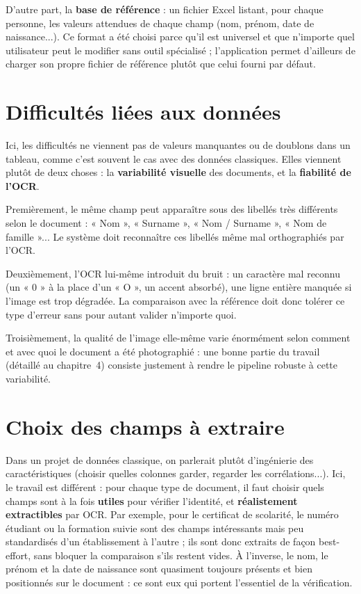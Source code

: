 D'autre part, la \textbf{base de référence} : un fichier Excel listant, pour chaque personne, les valeurs attendues de chaque champ (nom, prénom, date de naissance...). Ce format a été choisi parce qu'il est universel et que n'importe quel utilisateur peut le modifier sans outil spécialisé ; l'application permet d'ailleurs de charger son propre fichier de référence plutôt que celui fourni par défaut.

\section{Difficultés liées aux données}

Ici, les difficultés ne viennent pas de valeurs manquantes ou de doublons dans un tableau, comme c'est souvent le cas avec des données classiques. Elles viennent plutôt de deux choses : la \textbf{variabilité visuelle} des documents, et la \textbf{fiabilité de l'OCR}.

Premièrement, le même champ peut apparaître sous des libellés très différents selon le document : « Nom », « Surname », « Nom / Surname », « Nom de famille »... Le système doit reconnaître ces libellés même mal orthographiés par l'OCR.

Deuxièmement, l'OCR lui-même introduit du bruit : un caractère mal reconnu (un « 0 » à la place d'un « O », un accent absorbé), une ligne entière manquée si l'image est trop dégradée. La comparaison avec la référence doit donc tolérer ce type d'erreur sans pour autant valider n'importe quoi.

Troisièmement, la qualité de l'image elle-même varie énormément selon comment et avec quoi le document a été photographié : une bonne partie du travail (détaillé au chapitre~4) consiste justement à rendre le pipeline robuste à cette variabilité.

\section{Choix des champs à extraire}

Dans un projet de données classique, on parlerait plutôt d'ingénierie des caractéristiques (choisir quelles colonnes garder, regarder les corrélations...). Ici, le travail est différent : pour chaque type de document, il faut choisir quels champs sont à la fois \textbf{utiles} pour vérifier l'identité, et \textbf{réalistement extractibles} par OCR. Par exemple, pour le certificat de scolarité, le numéro étudiant ou la formation suivie sont des champs intéressants mais peu standardisés d'un établissement à l'autre ; ils sont donc extraits de façon best-effort, sans bloquer la comparaison s'ils restent vides. À l'inverse, le nom, le prénom et la date de naissance sont quasiment toujours présents et bien positionnés sur le document : ce sont eux qui portent l'essentiel de la vérification.


